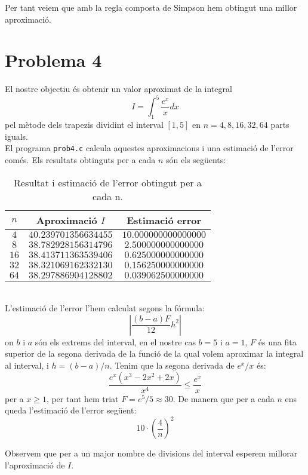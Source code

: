 \documentclass[12pt]{article}
\numberwithin{table}{section}
\numberwithin{figure}{section}
\numberwithin{equation}{section}
\begin{document}
Per tant veiem que amb la regla composta de Simpson hem obtingut una millor aproximació.
\newpage
\section*{Problema 4}
El nostre objectiu és obtenir un valor aproximat de la integral
\begin{equation*}
I=\int^{5}_1\dfrac{e^x}{x}dx
\end{equation*}
pel mètode dels trapezis dividint el interval $[1,5]$ en $n=4, 8, 16, 32, 64$ parts iguals.\\

El programa \texttt{prob4.c} calcula aquestes aproximacions i una estimació de l'error comés. Els resultats obtinguts per a cada $n$ són els següents:
\begin{table}[h!]
	\centering
	\caption{Resultat i estimació de l'error obtingut per a cada n.}	
	\begin{tabular}{c|c|c}
		$n$ & Aproximació $I$ &Estimació error\\
		\hline
		\hline
		$4$ & $40.239701356634455$  &$10.000000000000000$\\
		$8$ & $38.782928156314796$ &$2.500000000000000$\\
		$16$ & $38.413711363539406$ &$0.625000000000000$\\
		$32$ & $38.321069162332130$ &$0.156250000000000$\\
		$64$ & $38.297886904128802$ &$0.039062500000000$\\
	\end{tabular}
\end{table}\\
L'estimació de l'error l'hem calculat segons la fórmula:
$$\left| \dfrac{(b-a)F}{12}h^2 \right| $$
on $b$ i $a$ són els extrems del interval, en el nostre cas $b=5$ i $a=1$, $F$ és una fita superior de la segona derivada de la funció de la qual volem aproximar la integral al interval, i $h=(b-a)/n$. Tenim que la segona derivada de $e^x/x$ és:
$$\dfrac{e^x(x^3-2x^2+2x)}{x^4}\leq\dfrac{e^x}{x}$$
per a $x\geq 1$, per tant hem triat $F=e^5/5\approx30$. De manera que per a cada $n$ ens queda l'estimació de l'error següent:
$$10\cdot\left( \frac{4}{n}\right)^2 $$

Observem que per a un major nombre de divisions del interval esperem millorar l'aproximació de $I$.
\end{document}
